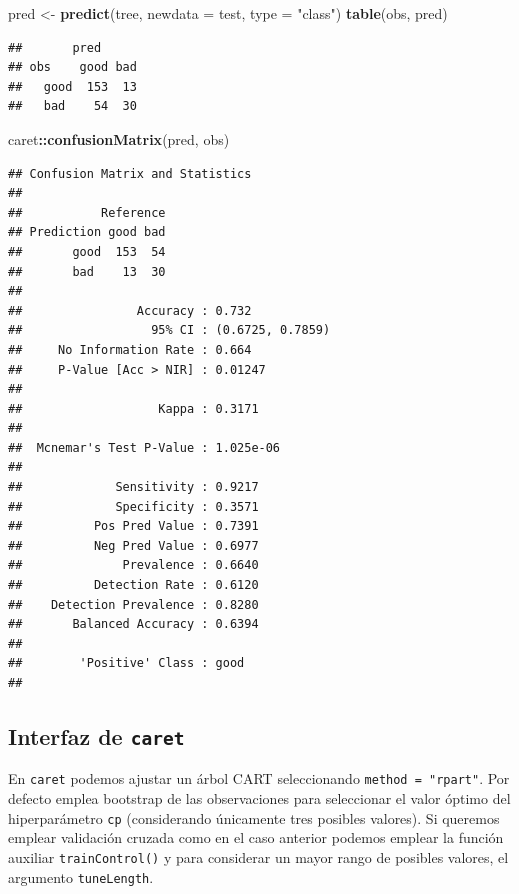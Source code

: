 \documentclass[]{book}
\newenvironment{Shaded}{\begin{snugshade}}{\end{snugshade}}
\newcommand{\KeywordTok}[1]{\textcolor[rgb]{0.13,0.29,0.53}{\textbf{#1}}}
\newcommand{\DataTypeTok}[1]{\textcolor[rgb]{0.13,0.29,0.53}{#1}}
\newcommand{\StringTok}[1]{\textcolor[rgb]{0.31,0.60,0.02}{#1}}
\newcommand{\OperatorTok}[1]{\textcolor[rgb]{0.81,0.36,0.00}{\textbf{#1}}}
\newcommand{\NormalTok}[1]{#1}
\theoremstyle{break}
\theoremstyle{definition}
\theoremstyle{definition}
\theoremstyle{definition}
\theoremstyle{remark}
\begin{document}
\begin{Shaded}
\begin{Highlighting}[]
\NormalTok{pred <-}\StringTok{ }\KeywordTok{predict}\NormalTok{(tree, }\DataTypeTok{newdata =}\NormalTok{ test, }\DataTypeTok{type =} \StringTok{"class"}\NormalTok{)}
\KeywordTok{table}\NormalTok{(obs, pred)}
\end{Highlighting}
\end{Shaded}

\begin{verbatim}
##       pred
## obs    good bad
##   good  153  13
##   bad    54  30
\end{verbatim}

\begin{Shaded}
\begin{Highlighting}[]
\NormalTok{caret}\OperatorTok{::}\KeywordTok{confusionMatrix}\NormalTok{(pred, obs)}
\end{Highlighting}
\end{Shaded}

\begin{verbatim}
## Confusion Matrix and Statistics
## 
##           Reference
## Prediction good bad
##       good  153  54
##       bad    13  30
##                                           
##                Accuracy : 0.732           
##                  95% CI : (0.6725, 0.7859)
##     No Information Rate : 0.664           
##     P-Value [Acc > NIR] : 0.01247         
##                                           
##                   Kappa : 0.3171          
##                                           
##  Mcnemar's Test P-Value : 1.025e-06       
##                                           
##             Sensitivity : 0.9217          
##             Specificity : 0.3571          
##          Pos Pred Value : 0.7391          
##          Neg Pred Value : 0.6977          
##              Prevalence : 0.6640          
##          Detection Rate : 0.6120          
##    Detection Prevalence : 0.8280          
##       Balanced Accuracy : 0.6394          
##                                           
##        'Positive' Class : good            
## 
\end{verbatim}

\subsection{\texorpdfstring{Interfaz de
\texttt{caret}}{Interfaz de caret}}\label{interfaz-de-caret}

En \texttt{caret} podemos ajustar un árbol CART seleccionando
\texttt{method\ =\ "rpart"}. Por defecto emplea bootstrap de las
observaciones para seleccionar el valor óptimo del hiperparámetro
\texttt{cp} (considerando únicamente tres posibles valores). Si queremos
emplear validación cruzada como en el caso anterior podemos emplear la
función auxiliar \texttt{trainControl()} y para considerar un mayor
rango de posibles valores, el argumento \texttt{tuneLength}.
\end{document}
